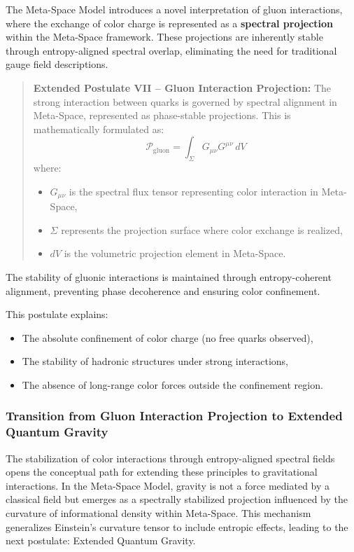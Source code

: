 \documentclass[10.5pt,a4paper]{article}
\begin{document}
The Meta-Space Model introduces a novel interpretation of gluon interactions, where the exchange of color charge 
is represented as a \textbf{spectral projection} within the Meta-Space framework. These projections are 
inherently stable through entropy-aligned spectral overlap, eliminating the need for traditional gauge field descriptions.

\begin{quote}
\textbf{Extended Postulate VII – Gluon Interaction Projection:}  
The strong interaction between quarks is governed by spectral alignment in Meta-Space, represented as 
phase-stable projections. This is mathematically formulated as:
\[
\mathcal{P}_{\text{gluon}} = \int_\Sigma G_{\mu\nu} G^{\mu\nu} \, dV
\]
where:
\begin{itemize}
  \item \( G_{\mu\nu} \) is the spectral flux tensor representing color interaction in Meta-Space,
  \item \( \Sigma \) represents the projection surface where color exchange is realized,
  \item \( dV \) is the volumetric projection element in Meta-Space.
\end{itemize}
\end{quote}

The stability of gluonic interactions is maintained through entropy-coherent alignment, preventing phase 
decoherence and ensuring color confinement.

This postulate explains:
\begin{itemize}
  \item The absolute confinement of color charge (no free quarks observed),
  \item The stability of hadronic structures under strong interactions,
  \item The absence of long-range color forces outside the confinement region.
\end{itemize}

\subsubsection*{Transition from Gluon Interaction Projection to Extended Quantum Gravity}

The stabilization of color interactions through entropy-aligned spectral fields opens the conceptual path 
for extending these principles to gravitational interactions. In the Meta-Space Model, gravity is not a force 
mediated by a classical field but emerges as a spectrally stabilized projection influenced by the curvature of 
informational density within Meta-Space. This mechanism generalizes Einstein's curvature tensor to include 
entropic effects, leading to the next postulate: Extended Quantum Gravity.
\end{document}
